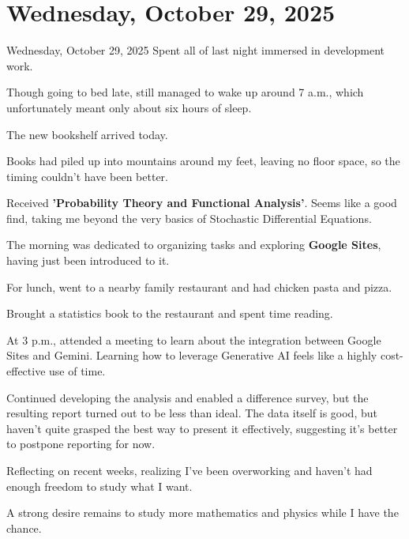 \documentclass[dvipdfmx, autodetect-engine, aspectratio=169, 10.5pt]{beamer}
\begin{document}
\section{Wednesday, October 29, 2025}
\begin{frame}{Wednesday, October 29, 2025}
\scriptsize
Spent all of last night immersed in development work.

Though going to bed late, still managed to wake up around 7 a.m., which unfortunately meant only about six hours of sleep.

The new bookshelf arrived today.

Books had piled up into mountains around my feet, leaving no floor space, so the timing couldn't have been better.

Received \textbf{'Probability Theory and Functional Analysis'}. Seems like a good find, taking me beyond the very basics of Stochastic Differential Equations.

The morning was dedicated to organizing tasks and exploring \textbf{Google Sites}, having just been introduced to it.

For lunch, went to a nearby family restaurant and had chicken pasta and pizza.

Brought a statistics book to the restaurant and spent time reading.

At 3 p.m., attended a meeting to learn about the integration between Google Sites and Gemini. Learning how to leverage Generative AI feels like a highly cost-effective use of time.

Continued developing the analysis and enabled a difference survey, but the resulting report turned out to be less than ideal. The data itself is good, but haven't quite grasped the best way to present it effectively, suggesting it's better to postpone reporting for now.

Reflecting on recent weeks, realizing I've been overworking and haven't had enough freedom to study what I want.

A strong desire remains to study more mathematics and physics while I have the chance.
\end{frame}
\end{document}
